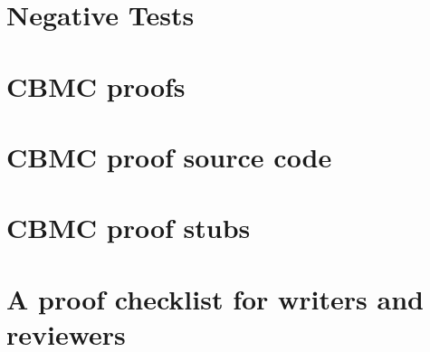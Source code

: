 \documentclass[twoside]{book}
\newcommand{\+}{\discretionary{\mbox{\scriptsize$\hookleftarrow$}}{}{}}
\begin{document}
\chapter{Negative Tests}
\label{md_crt_aws_crt_cpp_crt_aws_c_common_verification_cbmc_templates_template_for_repository_negative_tests__r_e_a_d_m_e}

\chapter{CBMC proofs}
\label{md_crt_aws_crt_cpp_crt_aws_c_common_verification_cbmc_templates_template_for_repository_proofs__r_e_a_d_m_e}

\chapter{CBMC proof source code}
\label{md_crt_aws_crt_cpp_crt_aws_c_common_verification_cbmc_templates_template_for_repository_sources__r_e_a_d_m_e}

\chapter{CBMC proof stubs}
\label{md_crt_aws_crt_cpp_crt_aws_c_common_verification_cbmc_templates_template_for_repository_stubs__r_e_a_d_m_e}

\chapter{A proof checklist for writers and reviewers}
\label{md_crt_aws_crt_cpp_crt_aws_c_common_verification_cbmc_templates_training_material_checklist}

\end{document}
